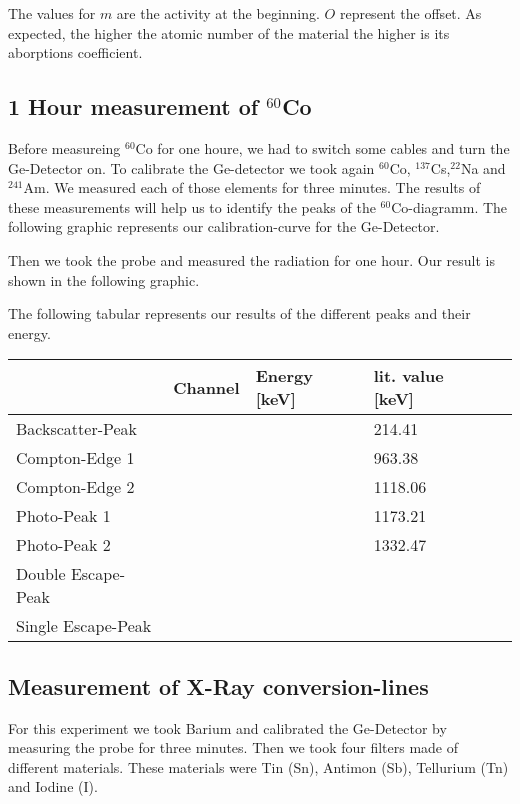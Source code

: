 The values for $m$ are the activity at the beginning. $O$ represent the offset. As expected, the higher the atomic number of the material the higher is its aborptions coefficient.

\newpage
\subsection{1 Hour measurement of $^{60}$Co}
Before measureing $^{60}$Co for one houre, we had to switch some cables and turn the Ge-Detector on. To calibrate the Ge-detector we took again $^{60}$Co, $^{137}$Cs,$^{22}$Na and $^{241}$Am. We measured each of those elements for three minutes. The results of these measurements will help us to identify the peaks of the $^{60}$Co-diagramm. The following graphic represents our calibration-curve for the Ge-Detector.



Then we took the probe and measured the radiation for one hour. Our result is shown in the following graphic.


The following tabular represents our results of the different peaks and their energy.

\begin{tabular}{l|l|l|l|l}
& Channel & Energy [keV] & lit. value [keV] & \\
\hline
Backscatter-Peak &&& 214.41	\\
Compton-Edge 1 &&& 963.38 	\\
Compton-Edge 2 &&& 1118.06 	\\
Photo-Peak 1 &&& 1173.21 	\\
Photo-Peak 2 &&& 1332.47 	\\
Double Escape-Peak &&&		\\
Single Escape-Peak &&&		\\
\end{tabular}

\subsection{Measurement of X-Ray conversion-lines}
For this experiment we took Barium and calibrated the Ge-Detector by measuring the probe for three minutes. Then we took four filters made of different materials. These materials were Tin (Sn), Antimon (Sb),  Tellurium (Tn) and Iodine (I).
